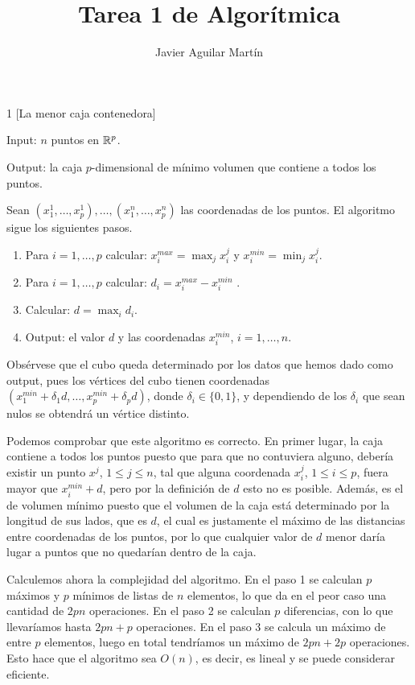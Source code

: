 \documentclass[twoside]{article}
\begin{document}
\title{Tarea 1 de Algorítmica}
\author{Javier Aguilar Martín}
\maketitle


\begin{ejercicio}{1}
[La menor caja contenedora]\

Input: $n$ puntos en $\mathbb{R}^p$. 

Output: la caja $p$-dimensional de mínimo volumen que contiene a todos los puntos. 
\end{ejercicio}
\begin{solucion}
Sean $(x_1^1,\dots, x_p^1),\dots, (x_1^n,\dots, x_p^n)$ las coordenadas de los puntos. El algoritmo sigue los siguientes pasos.

\begin{enumerate}
\item Para $i=1,\dots, p$ calcular: $x^{max}_i=\max_j x_i^j$ y $x^{min}_i=\min_j x_i^j$.
\item Para $i=1,\dots, p$ calcular: $d_i=x^{max}_i-x^{min}_i$ .
\item Calcular: $d=\max_i d_i$.
\item Output: el valor $d$ y las coordenadas $x^{min}_i$, $i=1,\dots, n$. 
\end{enumerate}
Obsérvese que el cubo queda determinado por los datos que hemos dado como output, pues los vértices del cubo tienen coordenadas $(x^{min}_1+\delta_1 d,\dots, x^{min}_p+\delta_p d)$, donde $\delta_i\in \{0,1\}$, y dependiendo de los $\delta_i$ que sean nulos se obtendrá un vértice distinto.

Podemos comprobar que este algoritmo es correcto. En primer lugar, la caja contiene a todos los puntos puesto que para que no contuviera alguno, debería existir un punto $x^j$, $1\leq j\leq n$, tal que alguna coordenada $x^j_i$, $1\leq i\leq p$, fuera mayor que $x^{min}_i+d$, pero por la definición de $d$ esto no es posible. Además, es el de volumen mínimo puesto que el volumen de la caja está determinado por la longitud de sus lados, que es $d$, el cual es justamente el máximo de las distancias entre coordenadas de los puntos, por lo que cualquier valor de $d$ menor daría lugar a puntos que no quedarían dentro de la caja.


Calculemos ahora la complejidad del algoritmo. En el paso 1 se calculan $p$ máximos y $p$ mínimos de listas de $n$ elementos, lo que da en el peor caso una cantidad de $2pn$ operaciones.  En el paso 2 se calculan $p$ diferencias, con lo que llevaríamos hasta $2pn+p$ operaciones. En el paso 3 se calcula un máximo de entre $p$ elementos, luego en total tendríamos un máximo de $2pn+2p$ operaciones. Esto hace que el algoritmo sea $O(n)$, es decir, es lineal y se puede considerar eficiente. 
\end{solucion}
\end{document}
